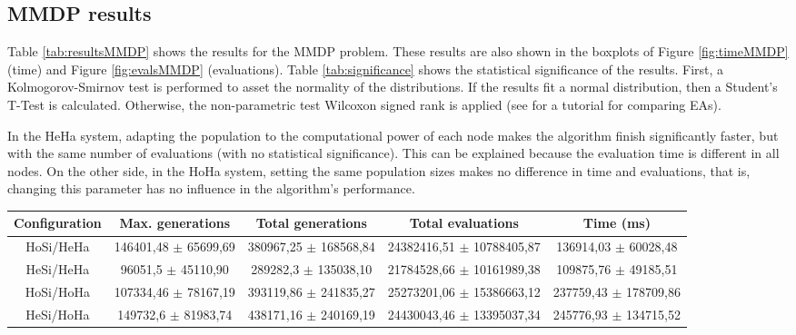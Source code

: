 \subsection{MMDP results}

Table \ref{tab:resultsMMDP} shows the results for the MMDP problem. These results are also shown in the boxplots of Figure \ref{fig:timeMMDP} (time) and Figure \ref{fig:evalsMMDP} (evaluations). Table \ref{tab:significance} shows the statistical significance of the results. First, a Kolmogorov-Smirnov test is performed to asset the normality of the distributions. If the results fit a normal distribution, then a Student's T-Test is calculated. Otherwise, the non-parametric test Wilcoxon signed rank is applied (see \cite{TUTORIAL} for a tutorial for comparing EAs).

 In the HeHa system, adapting the population to the computational power of each node makes the algorithm finish significantly faster, but with the same number of evaluations (with no statistical significance). This can be explained because the evaluation time is different in all nodes. On the other side, in the HoHa system, setting the same population sizes makes no difference in time and evaluations, that is, changing this parameter has no influence in the algorithm's performance. 

\begin{table*}
\centering
\caption{Results for the MMDP problem.}
\begin{tabular}{|c|c|c|c|c|} \hline
Configuration & Max. generations      & Total generations     &   Total evaluations     & Time (ms) \\ \hline
HoSi/HeHa   & 146401,48 $\pm$ 65699,69  & 380967,25 $\pm$ 168568,84 & 24382416,51 $\pm$ 10788405,87 & 136914,03 $\pm$ 60028,48\\ \hline
HeSi/HeHa   & 96051,5 $\pm$ 45110,90  & 289282,3  $\pm$ 135038,10 & 21784528,66 $\pm$ 10161989,38 & 109875,76 $\pm$ 49185,51\\ \hline \hline
HoSi/HoHa   & 107334,46 $\pm$ 78167,19  & 393119,86 $\pm$ 241835,27 & 25273201,06 $\pm$ 15386663,12 & 237759,43 $\pm$ 178709,86\\ \hline
HeSi/HoHa   & 149732,6 $\pm$ 81983,74 & 438171,16 $\pm$ 240169,19 & 24430043,46 $\pm$ 13395037,34 & 245776,93 $\pm$ 134715,52\\ \hline

\end{tabular}
\label{tab:resultsMMDP}
\end{table*}

